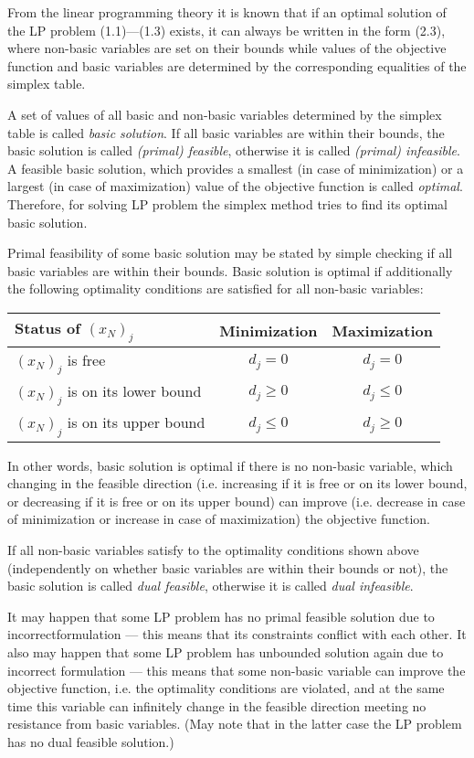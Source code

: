 From the linear programming theory it is known that if an optimal
solution of the LP problem (1.1)---(1.3) exists, it can always be
written in the form (2.3), where non-basic variables are set on their
bounds while values of the objective function and basic variables are
determined by the corresponding equalities of the simplex table.

A set of values of all basic and non-basic variables determined by the
simplex table is called {\it basic solution}. If all basic variables
are within their bounds, the basic solution is called {\it (primal)
feasible}, otherwise it is called {\it (primal) infeasible}. A feasible
basic solution, which provides a smallest (in case of minimization) or
a largest (in case of maximization) value of the objective function is
called {\it optimal}. Therefore, for solving LP problem the simplex
method tries to find its optimal basic solution.

Primal feasibility of some basic solution may be stated by simple
checking if all basic variables are within their bounds. Basic solution
is optimal if additionally the following optimality conditions are
satisfied for all non-basic variables:
\begin{center}
\begin{tabular}{lcc}
Status of $(x_N)_j$ & Minimization & Maximization \\
\hline
$(x_N)_j$ is free & $d_j = 0$ & $d_j = 0$ \\
$(x_N)_j$ is on its lower bound & $d_j \geq 0$ & $d_j \leq 0$ \\
$(x_N)_j$ is on its upper bound & $d_j \leq 0$ & $d_j \geq 0$ \\
\end{tabular}
\end{center}
In other words, basic solution is optimal if there is no non-basic
variable, which changing in the feasible direction (i.e. increasing if
it is free or on its lower bound, or decreasing if it is free or on its
upper bound) can improve (i.e. decrease in case of minimization or
increase in case of maximization) the objective function.

If all non-basic variables satisfy to the optimality conditions shown
above (independently on whether basic variables are within their bounds
or not), the basic solution is called {\it dual feasible}, otherwise it
is called {\it dual infeasible}.

It may happen that some LP problem has no primal feasible solution due
to incorrect\linebreak formulation --- this means that its constraints
conflict with each other. It also may happen that some LP problem has
unbounded solution again due to incorrect formulation --- this means
that some non-basic variable can improve the objective function, i.e.
the optimality conditions are violated, and at the same time this
variable can infinitely change in the feasible direction meeting
no resistance from basic variables. (May note that in the latter case
the LP problem has no dual feasible solution.)

